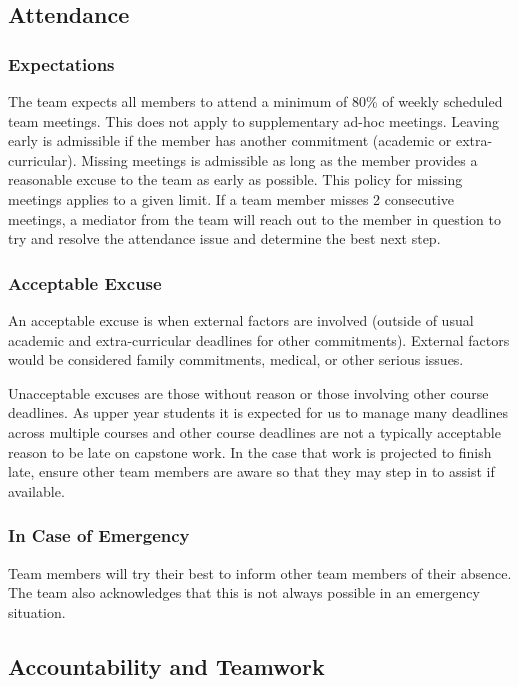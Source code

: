 \documentclass{article}
\begin{document}
\subsection*{Attendance}

\subsubsection*{Expectations}

The team expects all members to attend a minimum of 80\% of weekly scheduled team meetings. This does not apply to supplementary ad-hoc meetings. Leaving early is admissible if the member has another commitment (academic or extra-curricular). Missing meetings is admissible as long as the member provides a reasonable excuse to the team as early as possible.
This policy for missing meetings applies to a given limit. If a team member misses 2 consecutive meetings, a mediator from the team will reach out to the member in question to try and resolve the attendance issue and determine the best next step.

\subsubsection*{Acceptable Excuse}

An acceptable excuse is when external factors are involved (outside of usual academic and extra-curricular deadlines for other commitments). External factors would be considered family commitments, medical, or other serious issues.

Unacceptable excuses are those without reason or those involving other course deadlines. As upper year students it is expected for us to manage many deadlines across multiple courses and other course deadlines are not a typically acceptable reason to be late on capstone work.
In the case that work is projected to finish late, ensure other team members are aware so that they may step in to assist if available.

\subsubsection*{In Case of Emergency}

Team members will try their best to inform other team members of their absence. The team also acknowledges that this is not always possible in an emergency situation.

\subsection*{Accountability and Teamwork}
\end{document}
